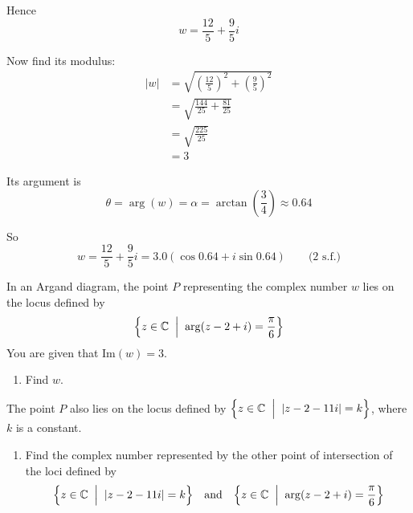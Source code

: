 \documentclass[leqno]{article}
\begin{document}
\begin{enumerate}[
  label=\textbf{\arabic*.},
  leftmargin=*,
  topsep=0pt,
  partopsep=0pt,
  parsep=0pt
]
\begin{djsSolution}
\begin{enumerate}[label=\textbf{(\alph*)}]
\begin{enumerate}[label=(\roman*)]
    Hence
    \[
    w=\frac{12}{5}+\frac{9}{5}i
    \]

    Now find its modulus:
    \begin{align*}
    |w| &= \sqrt{\left(\frac{12}{5}\right)^2+\left(\frac{9}{5}\right)^2} \\
        &= \sqrt{\frac{144}{25}+\frac{81}{25}} \\
        &= \sqrt{\frac{225}{25}} \\
        &= 3
    \end{align*}

    Its argument is
    \[
    \theta=\arg(w)=\alpha=\arctan\left(\frac34\right)\approx 0.64
    \]

    So
    \[
    w=\frac{12}{5}+\frac{9}{5}i=3.0(\cos 0.64+i\sin 0.64)\qquad\text{(2 s.f.)}
    \]
  \end{enumerate}
\end{enumerate}
\end{djsSolution}


\newpage

\questionitem

In an Argand diagram, the point $P$ representing the complex number $w$ lies on the locus defined by \[\Bigl\{ z\in\mathbb{C}\;\Bigm|\; \arg(z-2+i)=\frac{\pi}{6} \Bigr\}\] You are given that $\mathrm{Im}(w)=3$. \\

\begin{enumerate}[label=\textbf{(\alph*)}]
  \item Find $w$.  \\
\end{enumerate}

The point $P$ also lies on the locus defined by $\Bigl\{ z\in\mathbb{C}\;\Bigm|\; \lvert z-2-11i\rvert =k \Bigr\}$, where $k$ is a constant. \\

\begin{enumerate}[label=\textbf{(\alph*)}, resume]
  \item Find the complex number represented by the other point of intersection of the loci defined by \[\Bigl\{ z\in\mathbb{C}\;\Bigm|\; \lvert z-2-11i\rvert =k \Bigr\}\quad\text{and}\quad\Bigl\{ z\in\mathbb{C}\;\Bigm|\; \arg(z-2+i)=\frac{\pi}{6} \Bigr\}\]  \\
\end{enumerate}

\vspace*{10pt}


\end{enumerate}
\end{document}
